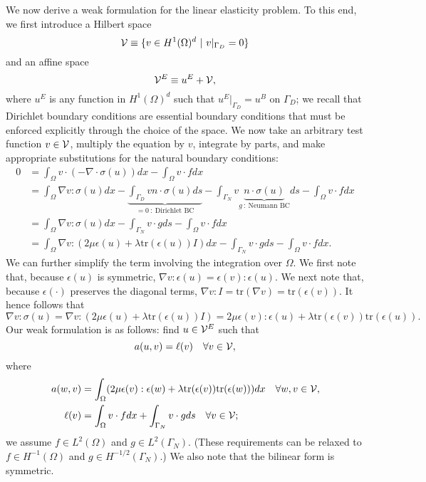 We now derive a weak formulation for the linear elasticity problem.  To this end, we first introduce a Hilbert space
\begin{equation}
  \calV \equiv \{ v \in H^1(\Omega)^d \ | \ v|_{\Gamma_D} = 0 \}
  \label{eq:le_calV}
\end{equation}
and an affine space
\begin{equation*}
  \mathcal{V}^E \equiv u^E + \mathcal{V},
\end{equation*}
where $u^E$ is any function in $H^1(\Omega)^d$ such that $u^E|_{\Gamma_D} = u^B$ on $\Gamma_D$; we recall that Dirichlet boundary conditions are essential boundary conditions that must be enforced explicitly through the choice of the space.  We now take an arbitrary test function $v \in \mathcal{V}$, multiply the equation by $v$, integrate by parts, and make appropriate substitutions for the natural boundary conditions: 
\begin{align*}
  0 &= 
  \int_{\Omega} v \cdot (-\nabla \cdot \sigma(u) ) dx - \int_{\Omega} v \cdot f dx \\
  &=
  \int_{\Omega} \nabla v : \sigma (u) dx - \underbrace{ \int_{\Gamma_D} v n \cdot \sigma(u) ds}_{= 0 \ : \ \text{Dirichlet BC}} - \int_{\Gamma_{N}} v \underbrace{ n \cdot \sigma(u)}_{g \ : \ \text{Neumann BC}} ds - \int_{\Omega} v \cdot f dx \\
  &=
  \int_{\Omega} \nabla v : \sigma (u) dx - \int_{\Gamma_N} v \cdot g ds - \int_{\Omega} v \cdot f dx  \\
  &=
  \int_{\Omega} \nabla v : (2 \mu \epsilon(u) + \lambda \text{tr}(\epsilon(u))I ) dx - \int_{\Gamma_N} v \cdot g ds - \int_{\Omega} v \cdot f dx .
\end{align*}
We can further simplify the term involving the integration over $\Omega$.  We first note that, because $\epsilon(u)$ is symmetric, $\nabla v : \epsilon(u) = \epsilon(v) : \epsilon(u)$. We next note that,  because $\epsilon(\cdot)$ preserves the diagonal terms, $\nabla v: I = \text{tr}(\nabla v) =  \text{tr}(\epsilon(v))$. It hence follows that
\begin{equation*}
  \nabla v : \sigma(u) = \nabla v : (2 \mu \epsilon(u) + \lambda \text{tr}(\epsilon(u)) I )
  = 2 \mu \epsilon(v) : \epsilon(u) + \lambda \text{tr}(\epsilon(v)) \text{tr}(\epsilon(u)) .
\end{equation*}
Our weak formulation is as follows: find $u \in \mathcal{V}^E$ such that
\begin{equation}
  a(u,v) = \ell(v) \quad \forall v \in \mathcal{V},
  \label{eq:le_weak}
\end{equation}
where
\begin{align}
  a(w,v) &= \int_{\Omega} ( 2 \mu \epsilon(v) : \epsilon(w) + \lambda \text{tr}(\epsilon(v)) \text{tr}(\epsilon(w)) ) dx \quad \forall w, v \in \mathcal{V}, \label{eq:le_a} \\
  \ell(v) &=   \int_{\Omega} v \cdot f dx + \int_{\Gamma_N} v \cdot g ds \quad \forall v \in \mathcal{V} \label{eq:le_ell};
\end{align}
we assume $f \in L^2(\Omega)$ and $g \in L^2(\Gamma_N)$.  (These requirements can be relaxed to $f \in H^{-1}(\Omega)$ and $g \in H^{-1/2}(\Gamma_N)$.) We also note that the bilinear form is symmetric.

